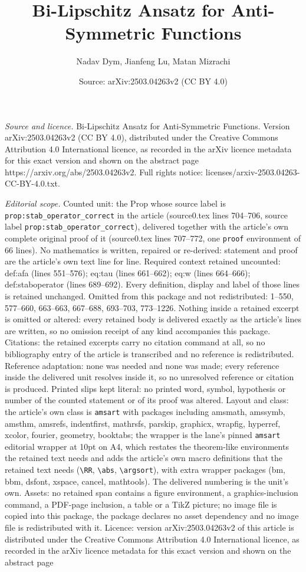 \documentclass[10pt,a4paper]{amsart}
\title[Bi-Lipschitz Ansatz for Anti-Symmetric Functions]{Bi-Lipschitz Ansatz for Anti-Symmetric Functions}
\author{Nadav Dym, Jianfeng Lu, Matan Mizrachi}
\date{Source: arXiv:2503.04263v2 (CC BY 4.0)}
\begin{document}
\maketitle

\noindent\emph{Source and licence.} Bi-Lipschitz Ansatz for Anti-Symmetric Functions. Version arXiv:2503.04263v2 (CC BY 4.0), distributed under the Creative Commons Attribution 4.0 International licence, as recorded in the arXiv licence metadata for this exact version and shown on the abstract page https://arxiv.org/abs/2503.04263v2. Full rights notice: licenses/arxiv-2503.04263-CC-BY-4.0.txt.\par\smallskip

\noindent\textit{Editorial scope.} Counted unit: the Prop whose source label is \texttt{prop:stab\_operator\_correct} in the article (source0.tex lines 704--706, source label \texttt{prop:stab\_operator\_correct}), delivered together with the article's own complete original proof of it (source0.tex lines 707--772, one \texttt{proof} environment of 66 lines). No mathematics is written, repaired or re-derived: statement and proof are the article's own text line for line. Required context retained uncounted: def:afa (lines 551--576); eq:tau (lines 661--662); eq:w (lines 664--666); def:staboperator (lines 689--692). Every definition, display and label of those lines is retained unchanged. Omitted from this package and not redistributed: 1--550, 577--660, 663--663, 667--688, 693--703, 773--1226. Nothing inside a retained excerpt is omitted or altered: every retained body is delivered exactly as the article's lines are written, so no omission receipt of any kind accompanies this package. Citations: the retained excerpts carry no citation command at all, so no bibliography entry of the article is transcribed and no reference is redistributed. Reference adaptation: none was needed and none was made; every reference inside the delivered unit resolves inside it, so no unresolved reference or citation is produced. Printed slips kept literal: no printed word, symbol, hypothesis or number of the counted statement or of its proof was altered. Layout and class: the article's own class is \texttt{amsart} with packages including amsmath, amssymb, amsthm, amsrefs, indentfirst, mathrsfs, parskip, graphicx, wrapfig, hyperref, xcolor, fourier, geometry, booktabs; the wrapper is the lane's pinned \texttt{amsart} editorial wrapper at 10pt on A4, which restates the theorem-like environments the retained text needs and adds the article's own macro definitions that the retained text needs (\texttt{\textbackslash RR}, \texttt{\textbackslash abs}, \texttt{\textbackslash argsort}), with extra wrapper packages (bm, bbm, dsfont, xspace, cancel, mathtools). The delivered numbering is the unit's own. Assets: no retained span contains a figure environment, a graphics-inclusion command, a PDF-page inclusion, a table or a TikZ picture; no image file is copied into this package, the package declares no asset dependency and no image file is redistributed with it. Licence: version arXiv:2503.04263v2 of this article is distributed under the Creative Commons Attribution 4.0 International licence, as recorded in the arXiv licence metadata for this exact version and shown on the abstract page 
\end{document}
